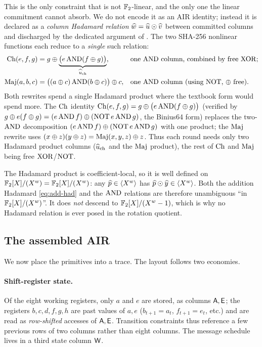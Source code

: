 This is the only constraint that is not $\mathbb{F}_2$-linear, and the only one
the linear commitment cannot absorb. We do not encode it as an AIR
identity; instead it is declared as a \emph{column Hadamard relation}
$\widehat{w} = \widehat{u}\odot\widehat{v}$ between committed columns and discharged by
the dedicated argument of . The two SHA-256 nonlinear
functions each reduce to a \emph{single} such relation:
\begin{align*}
  \operatorname{Ch}(e,f,g) &= g \oplus \underbrace{\bigl(e\operatorname{AND}(f\oplus g)\bigr)}_{\widehat{u}_{\mathrm{ch}}},
  & &\text{one $\operatorname{AND}$ column, combined by free $\operatorname{XOR}$;}\\
  \operatorname{Maj}(a,b,c) &= \bigl((a\oplus c)\operatorname{AND}(b\oplus c)\bigr)\oplus c,
  & &\text{one $\operatorname{AND}$ column (using $\operatorname{NOT}$, $\oplus$ free).}
\end{align*}
Both rewrites spend a single Hadamard product where the textbook form
would spend more. The $\operatorname{Ch}$ identity $\operatorname{Ch}(e,f,g) = g \oplus
\bigl(e\operatorname{AND}(f\oplus g)\bigr)$ (verified by $g \oplus e(f\oplus g) =
(e\operatorname{AND} f)\oplus(\operatorname{NOT} e\operatorname{AND} g)$, the Binius64 form) replaces the two-$\operatorname{AND}$
decomposition $(e\operatorname{AND} f)\oplus(\operatorname{NOT} e\operatorname{AND} g)$ with one product; the $\operatorname{Maj}$
rewrite uses $(x\oplus z)(y\oplus z) = \operatorname{Maj}(x,y,z)\oplus z$. Thus each
round needs only two Hadamard product columns ($\widehat{u}_{\mathrm{ch}}$ and
the $\operatorname{Maj}$ product), the rest of $\operatorname{Ch}$ and $\operatorname{Maj}$ being free $\operatorname{XOR}$/$\operatorname{NOT}$.

\begin{remark}
\label{rem:had-descend}
The Hadamard product is coefficient-local, so it is well defined on
$\mathbb{F}_2[X]/(X^{w})=\mathbb{F}_2[X]/(X^{w})$: any $\widehat{p}\in\langle X^{w} \rangle$ has
$\widehat{p}\odot\widehat{y}\in\langle X^{w} \rangle$. Both the addition Hadamard
\eqref{eq:add-had} and the $\operatorname{AND}$ relations are therefore unambiguous
``in $\mathbb{F}_2[X]/(X^{w})$''. It does \emph{not} descend to $\mathbb{F}_2[X]/(X^{w}-1)$, which is why no
Hadamard relation is ever posed in the rotation quotient.
\end{remark}

\subsection{The assembled AIR}
\label{sec:air}

We now place the primitives into a trace. The layout follows two economies.

\paragraph{Shift-register state.} Of the eight working registers, only
$a$ and $e$ are stored, as columns $\mathsf{A},\mathsf{E}$; the registers
$b,c,d,f,g,h$ are past values of $a,e$ ($b_{t+1}=a_t$, $f_{t+1}=e_t$,
etc.) and are read as \emph{row-shifted} accesses of $\mathsf{A},\mathsf{E}$.
Transition constraints thus reference a few previous rows of two columns
rather than eight columns. The message schedule lives in a third state
column $\mathsf{W}$.

